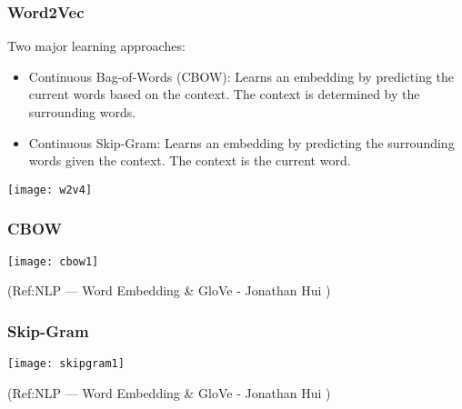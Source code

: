 \begin{frame}[fragile]\frametitle{Word2Vec}
Two major learning approaches:
  \begin{itemize}
    \item Continuous Bag-of-Words (CBOW): Learns an embedding by predicting the current words based on the context. The context is determined by the surrounding words.
	\item Continuous Skip-Gram: Learns an embedding by predicting the surrounding words given the context. The context is the current word.
  \end{itemize}
  
\begin{center}
\texttt{[image: w2v4]}
\end{center}

\end{frame}

\begin{frame}[fragile]\frametitle{CBOW}
  
\begin{center}
\texttt{[image: cbow1]}
\end{center}

{\tiny (Ref:NLP — Word Embedding \& GloVe - Jonathan Hui )}

\end{frame}


\begin{frame}[fragile]\frametitle{Skip-Gram}
  
\begin{center}
\texttt{[image: skipgram1]}
\end{center}

{\tiny (Ref:NLP — Word Embedding \& GloVe - Jonathan Hui )}

\end{frame}





